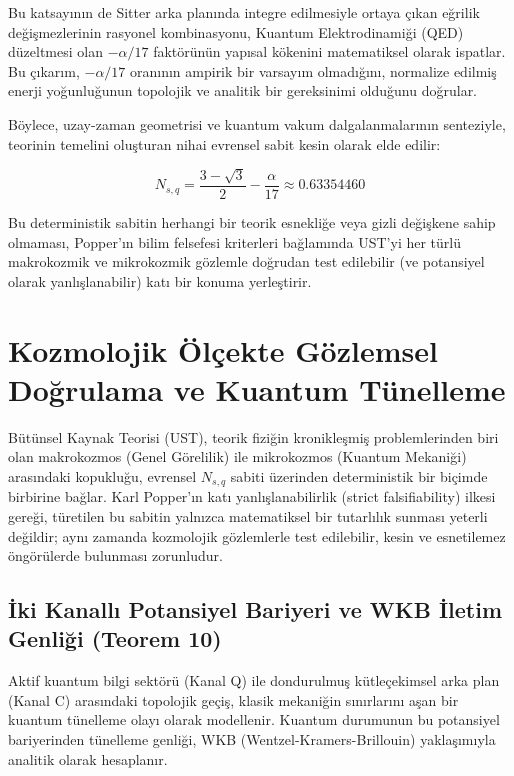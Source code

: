 \documentclass[12pt,a4paper]{article}
\begin{document}
Bu katsayının de Sitter arka planında integre edilmesiyle ortaya çıkan eğrilik değişmezlerinin rasyonel kombinasyonu, Kuantum Elektrodinamiği (QED) düzeltmesi olan $-\alpha/17$ faktörünün yapısal kökenini matematiksel olarak ispatlar. Bu çıkarım, $-\alpha/17$ oranının ampirik bir varsayım olmadığını, normalize edilmiş enerji yoğunluğunun topolojik ve analitik bir gereksinimi olduğunu doğrular. 

Böylece, uzay-zaman geometrisi ve kuantum vakum dalgalanmalarının senteziyle, teorinin temelini oluşturan nihai evrensel sabit kesin olarak elde edilir:

\begin{equation}
N_{s,q} = \frac{3 - \sqrt{3}}{2} - \frac{\alpha}{17} \approx 0.63354460
\end{equation}

Bu deterministik sabitin herhangi bir teorik esnekliğe veya gizli değişkene sahip olmaması, Popper'ın bilim felsefesi kriterleri bağlamında UST'yi her türlü makrokozmik ve mikrokozmik gözlemle doğrudan test edilebilir (ve potansiyel olarak yanlışlanabilir) katı bir konuma yerleştirir.

\section{Kozmolojik Ölçekte Gözlemsel Doğrulama ve Kuantum Tünelleme}

Bütünsel Kaynak Teorisi (UST), teorik fiziğin kronikleşmiş problemlerinden biri olan makrokozmos (Genel Görelilik) ile mikrokozmos (Kuantum Mekaniği) arasındaki kopukluğu, evrensel $N_{s,q}$ sabiti üzerinden deterministik bir biçimde birbirine bağlar. Karl Popper'ın katı yanlışlanabilirlik (strict falsifiability) ilkesi gereği, türetilen bu sabitin yalnızca matematiksel bir tutarlılık sunması yeterli değildir; aynı zamanda kozmolojik gözlemlerle test edilebilir, kesin ve esnetilemez öngörülerde bulunması zorunludur.

\subsection{İki Kanallı Potansiyel Bariyeri ve WKB İletim Genliği (Teorem 10)}
Aktif kuantum bilgi sektörü (Kanal Q) ile dondurulmuş kütleçekimsel arka plan (Kanal C) arasındaki topolojik geçiş, klasik mekaniğin sınırlarını aşan bir kuantum tünelleme olayı olarak modellenir. Kuantum durumunun bu potansiyel bariyerinden tünelleme genliği, WKB (Wentzel-Kramers-Brillouin) yaklaşımıyla analitik olarak hesaplanır.
\end{document}
